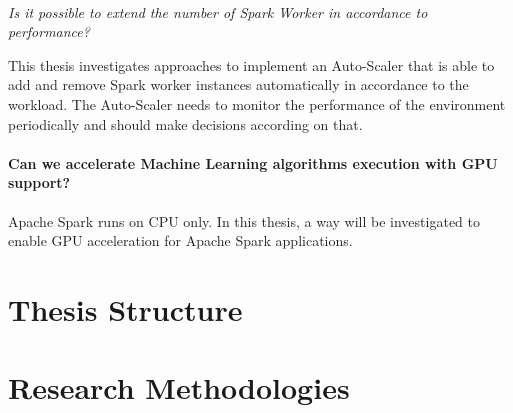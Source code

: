\paragraph{}
\textit{Is it possible to extend the number of Spark Worker in accordance to performance?}


% 
This thesis investigates approaches to implement an Auto-Scaler that is able to add and remove Spark worker instances automatically in accordance to the workload. The Auto-Scaler needs to monitor the performance of the environment periodically and should make decisions according on that.


\paragraph{Can we accelerate Machine Learning algorithms execution with GPU support?}
%
Apache Spark runs on CPU only.  In this thesis, a way will be investigated to enable GPU acceleration for Apache Spark applications.


\section{Thesis Structure}

\section{Research Methodologies}
